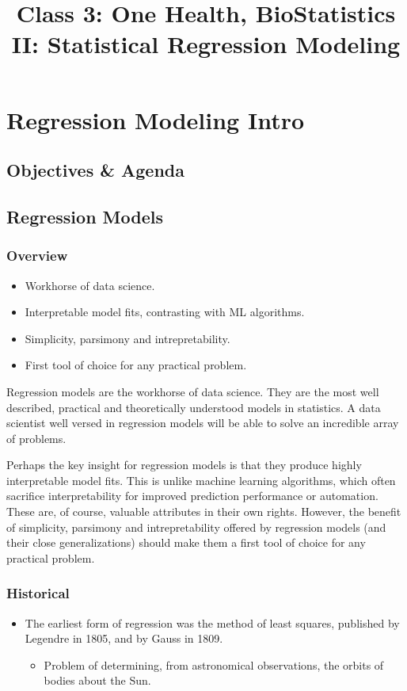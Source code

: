 \documentclass[10pt,article]{article}
\date{\vspace{-6ex}}
\title{Class 3: One Health, BioStatistics II: Statistical Regression Modeling}
\begin{document}
\maketitle
\section{Regression Modeling Intro}
\label{sec:org7cfd461}
\subsection{Objectives \& Agenda}
\label{RegModelsAgenda}
\subsection{Regression Models}
\label{Lectures/Coursera/Regression Models}
\subsubsection{Overview}
\label{sec:org682962b}
\begin{itemize}
\item Workhorse of data science.

\item Interpretable model fits, contrasting with ML algorithms.

\item Simplicity, parsimony and intrepretability.

\item First tool of choice for any practical problem.
\end{itemize}

Regression models are the workhorse of data science. They are the most well described, practical and theoretically understood models in statistics. A data scientist well versed in regression models will be able to solve an incredible array of problems.

Perhaps the key insight for regression models is that they produce highly interpretable model fits. This is unlike machine learning algorithms, which often sacrifice interpretability for improved prediction performance or automation. These are, of course, valuable attributes in their own rights. However, the benefit of simplicity, parsimony and intrepretability offered by regression models (and their close generalizations) should make them a first tool of choice for any practical problem.
\subsubsection{Historical}
\label{sec:org5734a5e}
\begin{itemize}
\item The earliest form of regression was the method of least squares, published by Legendre in 1805, and by Gauss in 1809.
\begin{itemize}
\item Problem of determining, from astronomical observations, the orbits of bodies about the Sun.
\end{itemize}
\end{itemize}
\end{document}
